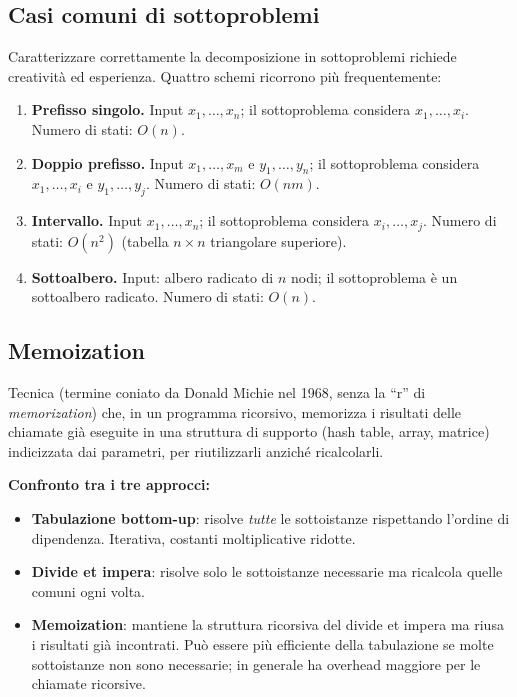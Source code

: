 \subsection{Casi comuni di sottoproblemi}

\begin{nota}
Caratterizzare correttamente la decomposizione in sottoproblemi richiede
creatività ed esperienza. Quattro schemi ricorrono più frequentemente:
\begin{enumerate}
	\item \textbf{Prefisso singolo.} Input $x_1,\ldots,x_n$; il sottoproblema
	considera $x_1,\ldots,x_i$. Numero di stati: $O(n)$.
	\item \textbf{Doppio prefisso.} Input $x_1,\ldots,x_m$ e $y_1,\ldots,y_n$;
	il sottoproblema considera $x_1,\ldots,x_i$ e $y_1,\ldots,y_j$.
	Numero di stati: $O(nm)$.
	\item \textbf{Intervallo.} Input $x_1,\ldots,x_n$; il sottoproblema
	considera $x_i,\ldots,x_j$. Numero di stati: $O(n^2)$
	(tabella $n \times n$ triangolare superiore).
	\item \textbf{Sottoalbero.} Input: albero radicato di $n$ nodi; il
	sottoproblema è un sottoalbero radicato. Numero di stati: $O(n)$.
\end{enumerate}
\end{nota}

\subsection{Memoization}

\begin{definizione}[Memoization]
Tecnica (termine coniato da Donald Michie nel 1968, senza la ``r'' di
\emph{memorization}) che, in un programma ricorsivo, memorizza i risultati delle
chiamate già eseguite in una struttura di supporto (hash table, array, matrice)
indicizzata dai parametri, per riutilizzarli anziché ricalcolarli.
\end{definizione}

\begin{softnote}
\textbf{Confronto tra i tre approcci:}
\begin{itemize}
	\item \textbf{Tabulazione bottom-up}: risolve \emph{tutte} le sottoistanze
	rispettando l'ordine di dipendenza. Iterativa, costanti moltiplicative
	ridotte.
	\item \textbf{Divide et impera}: risolve solo le sottoistanze necessarie ma
	ricalcola quelle comuni ogni volta.
	\item \textbf{Memoization}: mantiene la struttura ricorsiva del divide et
	impera ma riusa i risultati già incontrati. Può essere più efficiente
	della tabulazione se molte sottoistanze non sono necessarie; in generale
	ha overhead maggiore per le chiamate ricorsive.
\end{itemize}
\end{softnote}

